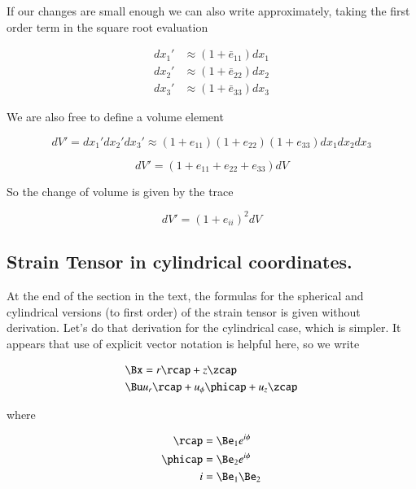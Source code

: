 If our changes are small enough we can also write approximately, taking the first order term in the square root evaluation

\begin{align}\label{eqn:continuumL2:290}
dx_1' &\approx (1 + \bar{e}_{11}) dx_1 \\
dx_2' &\approx (1 + \bar{e}_{22}) dx_2 \\
dx_3' &\approx (1 + \bar{e}_{33}) dx_3
\end{align}

We are also free to define a volume element

\begin{equation}\label{eqn:continuumL2:310}
dV' = 
dx_1'
dx_2'
dx_3'
\approx
(1 + e_{11})
(1 + e_{22})
(1 + e_{33})
dx_1 dx_2 dx_3
\end{equation}

\begin{equation}\label{eqn:continuumL2:330}
dV' = (1 + e_{11} +e_{22} +e_{33} ) dV
\end{equation}

So the change of volume is given by the trace

\begin{equation}\label{eqn:continuumL2:350}
dV' = ( 1 + e_{ii} )^2 dV
\end{equation}

\subsection{Strain Tensor in cylindrical coordinates.}

At the end of the section in the text, the formulas for the spherical and cylindrical versions (to first order) of the strain tensor is given without derivation.  Let's do that derivation for the cylindrical case, which is simpler.  It appears that use of explicit vector notation is helpful here, so we write

\begin{align}\label{eqn:continuumL2:370}
\Bx &= r \rcap + z \zcap \\
\Bu & u_r \rcap + u_\phi \phicap + u_z \zcap
\end{align}

where

\begin{align}\label{eqn:continuumL2:390}
\rcap &= \Be_1 e^{i\phi} \\
\phicap &= \Be_2 e^{i\phi} \\
i &= \Be_1 \Be_2
\end{align}

